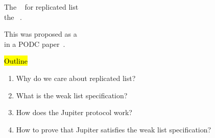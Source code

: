 
\begin{frame}{}
  \begin{center}
    \begin{mdframed}[frametitle = {\large \red{The Main Contribution}}, frametitlerule = true, frametitlebackgroundcolor = brown!20,
      frametitleaboveskip = 8pt, frametitlebelowskip = 8pt, innertopmargin = 10pt]
      {\Large The ~ for replicated list \\
       the ~.} \\[15pt]
    \end{mdframed}

    \pause
    \vspace{0.20cm}
    {\large This was proposed as a  \\ in a PODC paper~.}
  \end{center}
\end{frame}

\begin{frame}{}
  \begin{center}
    \hl{\large Outline}
  \end{center}

  \pause
  \begin{enumerate}[<+->]
    \setlength{\itemsep}{12pt}
    \item Why do we care about replicated list? 
    \item What is the weak list specification?
    \item How does the Jupiter protocol work?
    \item How to prove that Jupiter satisfies the weak list specification?
  \end{enumerate}
\end{frame}
